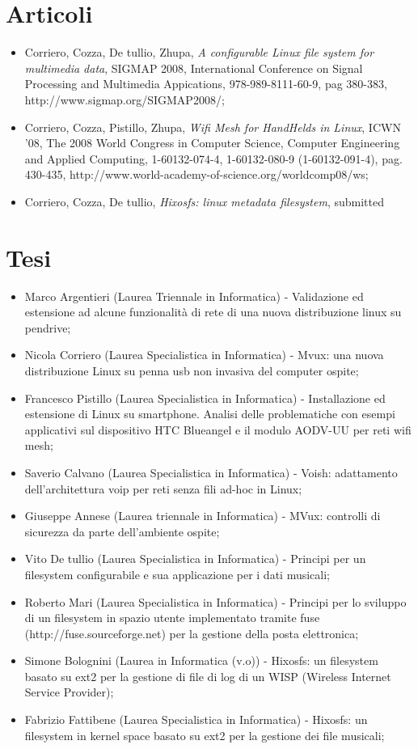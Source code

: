 \documentclass[a4paper,12pt]{article}
\renewcommand{\aa }{\`{a} }
\begin{document}
\section*{Articoli}
\begin{itemize}
\item Corriero, Cozza, De tullio, Zhupa, \textit{A configurable Linux file system for multimedia data}, SIGMAP 2008, International Conference on Signal Processing and Multimedia Appications, 978-989-8111-60-9, pag 380-383, \\http://www.sigmap.org/SIGMAP2008/;
\item Corriero, Cozza, Pistillo, Zhupa, \textit{Wifi Mesh for HandHelds in Linux}, ICWN '08, The 2008 World Congress in Computer Science, Computer Engineering and Applied Computing, 1-60132-074-4, 1-60132-080-9 (1-60132-091-4), pag. 430-435, http://www.world-academy-of-science.org/worldcomp08/ws;
\item Corriero, Cozza, De tullio, \textit{Hixosfs: linux metadata filesystem}, submitted
\end{itemize}

\section*{Tesi}
\begin{itemize}
\item Marco Argentieri (Laurea Triennale in Informatica) - Validazione ed estensione ad alcune funzionalit\aa di rete di una nuova distribuzione linux su pendrive;
\item Nicola Corriero (Laurea Specialistica in Informatica) - Mvux: una nuova distribuzione Linux su penna usb non invasiva del computer ospite;
\item Francesco Pistillo (Laurea Specialistica in Informatica) - Installazione ed estensione di Linux su smartphone. Analisi delle problematiche con esempi applicativi sul dispositivo HTC Blueangel e il modulo AODV-UU per reti wifi mesh;
\item Saverio Calvano (Laurea Specialistica in Informatica) - Voish: adattamento dell'architettura voip per reti senza fili ad-hoc in Linux;
 \item Giuseppe Annese (Laurea triennale in Informatica) - MVux: controlli di sicurezza da parte dell'ambiente ospite;
\item Vito De tullio (Laurea Specialistica in Informatica) - Principi per un filesystem configurabile e sua applicazione per i dati musicali;
\item Roberto Mari (Laurea Specialistica in Informatica) - Principi per lo sviluppo di un filesystem in spazio utente implementato tramite fuse \\(http://fuse.sourceforge.net) per la gestione della posta elettronica;
\item Simone Bolognini (Laurea in Informatica  (v.o)) - Hixosfs: un filesystem basato su ext2 per la gestione di file di log di un WISP (Wireless Internet Service Provider);
\item Fabrizio Fattibene (Laurea Specialistica in Informatica) - Hixosfs: un filesystem in kernel space basato su ext2 per la gestione dei file musicali;
\end{itemize}
\end{document}
